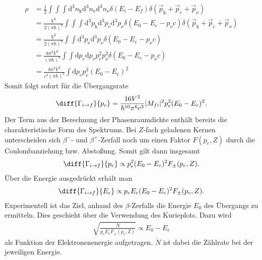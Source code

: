 \begin{align*}
  \rho&= \frac{1}{2}\int\int \int \mathrm{d}^3n_\mathrm{k} \mathrm{d}^3n_\mathrm{e}  \mathrm{d}^3n_\nu \delta (E_i-E_f) \delta (\vec{p}_\mathrm{k}+\vec{p}_e+\vec{p}_\nu)\\
  &=\frac{V^3}{2(\pi \hbar)^9} \int \int \int \mathrm{d}^3p_\mathrm{k}   \mathrm{d}^3p_\mathrm{e}  \mathrm{d}^3p_\nu\delta (E_0-E_e-p_\nu c) \delta (\vec{p}_\mathrm{k}+\vec{p}_e+\vec{p}_\nu)\\
  &=\frac{V^3}{2(\pi \hbar)^9}  \int \int  \mathrm{d}^3p_\mathrm{e} \mathrm{d}^3p_\nu \delta (E_0-E_e-p_\nu c)\\
  &= \frac{8 \pi^2 V^3}{(\pi \hbar)^9} \int \int \mathrm{d}p_e \mathrm{d}p_\nu p_e^2 p_\nu^2\delta (E_0-E_e-p_\nu c)\\
  &=\frac{8 \pi^2 V^3}{c^3 (\pi \hbar)^9} \int \mathrm{d}p_e p_e^2 (E_0-E_e)^2
\end{align*}
Somit folgt sofort für die Übergangsrate
\begin{align*}
  \diff{\Gamma_{i \rightarrow f}}{p_e}=\frac{16 V^3}{\hbar^{10} \pi^6 c^3}|M_{fi}|^2  p_e^2 (E_0-E_e)^2.
\end{align*}
Der Term aus der Berechnung der Phasenraumdichte enthält bereits die charakteristische Form des Spektrums. Bei $Z$-fach geladenen Kernen unterscheiden sich $\beta^-$- und $\beta^+$-Zerfall noch um einen Faktor $F(p_e,Z)$ durch die Coulombanziehung bzw. Abstoßung. Somit gilt dann insgesamt 
\begin{align*}
  \diff{\Gamma_{i \rightarrow f}}{p_e} \propto p_e^2(E_0-E_e)^2 F_\pm(p_e,Z).
\end{align*}
Über die Energie ausgedrückt erhält man
\begin{align*}
  \diff{\Gamma_{i \rightarrow f}}{E_e} \propto p_eE_e(E_0-E_e)^2 F_\pm(p_e,Z).
\end{align*}
Experimentell ist das Ziel, anhand des $\beta$-Zerfalls die Energie $E_0$ des Übergangs zu ermitteln. Dies geschieht über die Verwendung des Kurieplots. Dazu wird 
\begin{align*}
  \sqrt{\frac{\dot{N}}{p_eE_eF_\pm(p_e,Z)}} \propto E_0-E_e
\end{align*}
als Funktion der Elektronenenergie aufgetragen. $\dot{N}$ ist dabei die Zählrate bei der jeweiligen Energie.

